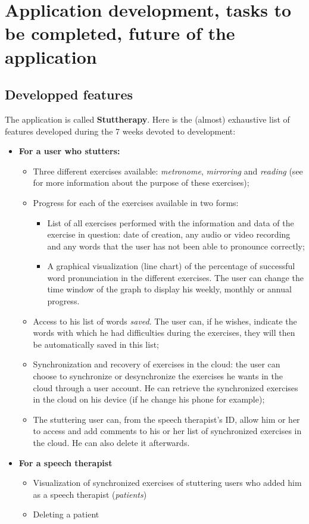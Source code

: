 \section{Application development, tasks to be completed, future of the application}

\subsection{Developped features}
The application is called \textbf{Stuttherapy}. Here is the (almost) exhaustive list of features developed during the 7 weeks devoted to development:

\begin{itemize}

  \item \textbf{For a user who stutters:}
  \begin{itemize}
    \item Three different exercises available: \textit{metronome}, \textit{mirroring} and \textit{reading} (see  for more information about the purpose of these exercises);
    \item Progress for each of the exercises available in two forms:
    \begin{itemize}
      \item List of all exercises performed with the information and data of the exercise in question: date of creation, any audio or video recording and any words that the user has not been able to pronounce correctly;
      \item A graphical visualization (line chart) of the percentage of successful word pronunciation in the different exercises. The user can change the time window of the graph to display his weekly, monthly or annual progress.
    \end{itemize}
    \item Access to his list of words \textit{saved}. The user can, if he wishes, indicate the words with which he had difficulties during the exercises, they will then be automatically saved in this list;
    \item Synchronization and recovery of exercises in the cloud: the user can choose to synchronize or desynchronize the exercises he wants in the cloud through a user account. He can retrieve the synchronized exercises in the cloud on his device (if he change his phone for example);
    \item The stuttering user can, from the speech therapist's ID, allow him or her to access and add comments to his or her list of synchronized exercises in the cloud. He can also delete it afterwards.
  \end{itemize}

  \item \textbf{For a speech therapist}
  \begin{itemize}
    \item Visualization of synchronized exercises of stuttering users who added him as a speech therapist (\textit{patients})
    \item Deleting a patient
  \end{itemize}
\end{itemize}

